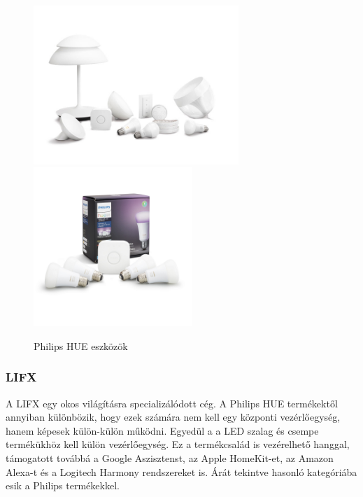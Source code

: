 \documentclass[../main.tex]{subfiles}
\begin{document}
            \begin{figure}[h!] %
                \centering
                    \includegraphics[height=6cm]{irodalom_res/philips_hue_termekek}
                    \includegraphics[height=6cm]{irodalom_res/philips_hue_termekek_2}
                \caption{Philips HUE eszközök}
                \label{fig:philips_hue}
             \end{figure}
            
            
        \subsubsection{LIFX}
            A LIFX egy okos világításra specializálódott cég. A Philips HUE termékektől annyiban különbözik, hogy ezek számára nem kell egy központi vezérlőegység, hanem képesek külön-külön működni. Egyedül a a LED szalag és csempe termékükhöz kell külön vezérlőegység. Ez a termékcsalád is vezérelhető hanggal, támogatott továbbá a Google Aszisztenst, az Apple HomeKit-et, az Amazon Alexa-t és a Logitech Harmony rendszereket is. Árát tekintve hasonló kategóriába esik a Philips termékekkel. 
            
\end{document}
